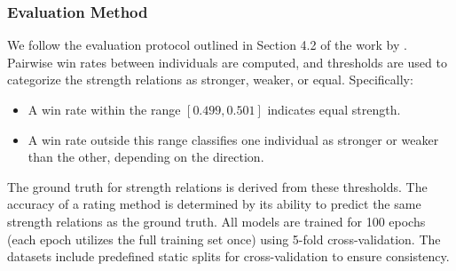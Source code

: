 \subsubsection{Evaluation Method}

We follow the evaluation protocol outlined in Section 4.2 of the work by \citet{game_balance_analysis}. Pairwise win rates between individuals are computed, and thresholds are used to categorize the strength relations as stronger, weaker, or equal. Specifically:
\begin{itemize}
    \item A win rate within the range $[0.499, 0.501]$ indicates equal strength.
    \item A win rate outside this range classifies one individual as stronger or weaker than the other, depending on the direction.
\end{itemize}

The ground truth for strength relations is derived from these thresholds. The accuracy of a rating method is determined by its ability to predict the same strength relations as the ground truth. All models are trained for 100 epochs (each epoch utilizes the full training set once) using 5-fold cross-validation. The datasets include predefined static splits for cross-validation to ensure consistency.

